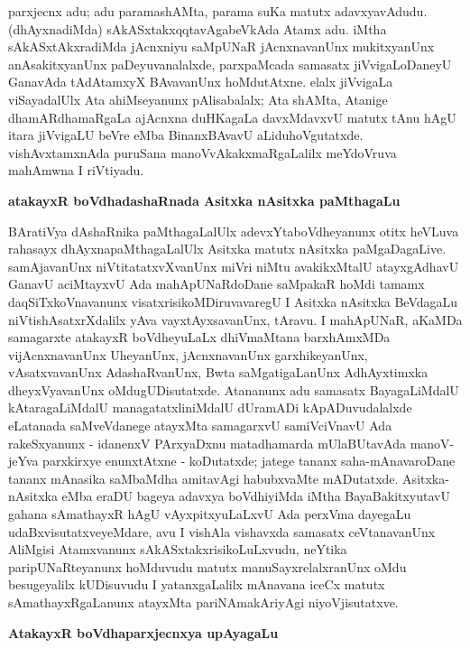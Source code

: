parxjecnx adu; adu paramashAMta, parama suKa matutx adavxyavAdudu. (dhAyxnadiMda) sAkASxtakxqqtavAgabeVkAda Atamx adu. iMtha sAkASxtAkxradiMda jAcnxniyu saMpUNaR jAcnxnavanUnx mukitxyanUnx anAsakitxyanUnx paDeyuvanalalxde, parxpaMcada samasatx jiVvigaLoDaneyU GanavAda tAdAtamxyX BAvavanUnx hoMdutAtxne. elalx jiVvigaLa viSayadalUlx Ata ahiMseyanunx pAlisabalalx; Ata shAMta, Atanige dhamARdhamaRgaLa ajAcnxna duHKagaLa davxMdavxvU matutx tAnu hAgU itara jiVvigaLU beVre eMba BinanxBAvavU aLiduhoVgutatxde. vishAvxtamxnAda puruSana manoVvAkakxmaRgaLalilx meYdoVruva mahAmwna I riVtiyadu.

\smallskip
\begin{center}
{\Large\bf atakayxR boVdhadashaRnada Asitxka nAsitxka paMthagaLu}
\end{center}

BAratiVya dAshaRnika paMthagaLalUlx adevxYtaboVdheyanunx otitx heVLuva rahasayx dhAyxnapaMthagaLalUlx Asitxka matutx nAsitxka paMgaDagaLive. samAjavanUnx niVtitatatxvXvanUnx miVri niMtu avakikxMtalU atayxgAdhavU GanavU aciMtayxvU Ada mahApUNaR\-doDane saMpakaR hoMdi tamamx daqSiTxkoVnavanunx visatxrisikoMDiruvavaregU I Asitxka nAsitxka BeVdagaLu niVtishAsatxrXdalilx yAva vayxtAyxsavanUnx, tAravu. I mahApUNaR, aKaMDa samagarxte atakayxR boVdheyuLaLx dhiVmaMtana barxhAmxMDa vijAcnxnavanUnx UheyanUnx, jAcnxnavanUnx garxhikeyanUnx, vAsatxvavanUnx AdashaRvanUnx, Bwta saMgatigaLanUnx AdhAyxtimxka dheyxVyavanUnx oMdugUDisutatxde. Atananunx adu samasatx BayagaLiMdalU kAtaragaLiMdalU managatatxliniMdalU dUramADi kApADuvudalalxde eLatanada saMveVdanege atayxMta samagarxvU samiVciVnavU Ada rakeSxyanunx - idanenxV PArxyaDxnu matadhamarda mUlaBUtavAda manoV-jeYva parxkirxye enunxtAtxne - koDutatxde; jatege tananx saha-mAnavaroDane tananx mAnasika saMbaMdha amitavAgi habubxvaMte mADutatxde. Asitxka-nAsitxka eMba eraDU bageya adavxya boVdhiyiMda iMtha BayaBakitxyutavU gahana sAmathayxR hAgU vAyxpitxyuLaLxvU Ada perxVma dayegaLu udaBxvisutatxveyeMdare, avu I vishAla vishavxda samasatx ceVtanavanUnx AliMgisi Atamxvanunx sAkASxtakxrisikoLuLxvudu, neYtika paripUNaRteyanunx hoMduvudu matutx manuSayxrelalxranUnx oMdu besugeyalilx kUDisuvudu I yatanxgaLalilx mAnavana iceCx matutx sAmathayxRgaLanunx atayxMta pariNAmakAriyAgi niyoVjisutatxve.

\smallskip
\begin{center}
{\Large\bf AtakayxR boVdhaparxjecnxya upAyagaLu}
\end{center}

